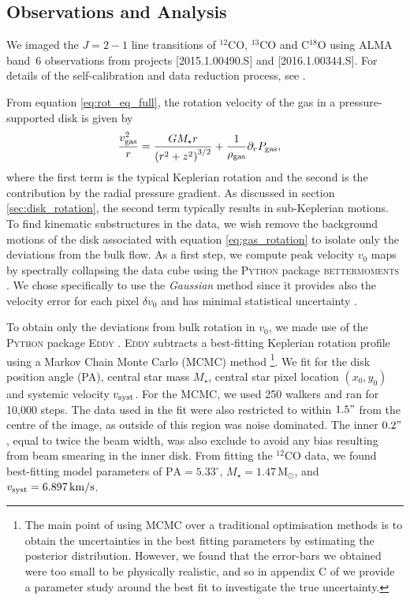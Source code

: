 \subsection{Observations and Analysis} \label{sec:obs_analysis_garg}

We imaged the $J=2-1$ line transitions of $^{12}$CO, $^{13}$CO and C$^{18}$O using ALMA band~6 observations from projects [2015.1.00490.S] and [2016.1.00344.S].
For details of the self-calibration and data reduction process, see \citet{garg2022}.

From equation \ref{eq:rot_eq_full}, the rotation velocity of the gas in a pressure-supported disk is given by 
\begin{align}
    \frac{v_{\rm gas}^2}{r} &= \frac{G M_\star r}{\left( r^2 + z^2  \right)^{3/2}} + \frac{1}{\rho_{\rm gas}} \partial_r P_{\rm gas}, \label{eq:gas_rotation}
\end{align}
where the first term is the typical Keplerian rotation and the second is the contribution by the radial pressure gradient.
As discussed in section \ref{sec:disk_rotation}, the second term typically results in sub-Keplerian motions.
To find kinematic substructures in the data, we wish remove the background motions of the disk associated with equation \ref{eq:gas_rotation} to isolate only the deviations from the bulk flow.
As a first step, we compute peak velocity $v_0$ maps by spectrally collapsing the data cube using the \textsc{Python} package \textsc{bettermoments} \citep{teague2018a}.
We chose specifically to use the \textit{Gaussian} method since it provides also the velocity error for each pixel $\delta v_0$ and has minimal statistical uncertainty \citep{yu2021}.

To obtain only the deviations from bulk rotation in $v_0$, we made use of the \textsc{Python} package \textsc{Eddy} \citep{teague2019}.
\textsc{Eddy} subtracts a best-fitting Keplerian rotation profile using a Markov Chain Monte Carlo (MCMC) method \citep{foreman-mackey2013}\footnote{The main point of using MCMC over a traditional optimisation methods is to obtain the uncertainties in the best fitting parameters by estimating the posterior distribution. However, we found that the error-bars we obtained were too small to be physically realistic, and so in appendix C of \citet{garg2022} we provide a parameter study around the best fit to investigate the true uncertainty.}.
We fit for the disk position angle (PA), central star mass $M_\star$, central star pixel location $(x_0,y_0)$ and systemic velocity $v_{\rm syst}$.
For the MCMC, we used 250 walkers and ran for 10,000 steps.
The data used in the fit were also restricted to within $1.5"$ from the centre of the image, as outside of this region was noise dominated.
The inner $0.2"$, equal to twice the beam width, was also exclude to avoid any bias resulting from beam smearing in the inner disk.
From fitting the $^{12}$CO data, we found best-fitting model parameters of $\mathrm{PA} = 5.33^\circ$, $M_\star = 1.47 \, \mathrm{M_\odot}$, and $v_{\rm syst} = 6.897 \, \mathrm{km/s}$.

